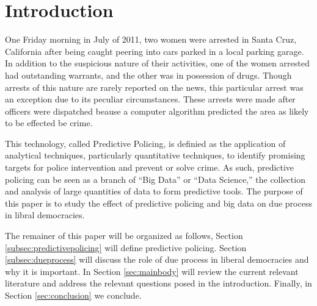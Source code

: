 \documentclass[12pt]{article} %
\newcommand{\hlfixme}[1]{\fxfatal{\hl{#1}}}
\begin{document}
\clearpage\thispagestyle{empty}\addtocounter{page}{-1}
\tableofcontents %
\newpage %


\section{Introduction}\label{sec:introduction} %

One Friday morning in July of 2011, two women were arrested in Santa Cruz, California after being caught peering into cars parked in a local parking garage. In addition to the suspicious nature of their activities, one of the women arrested had outstanding warrants, and the other was in possession of drugs. Though arrests of this nature are rarely reported on the news, this particular arrest was an exception due to its peculiar circumstances. These arrests were made after officers were dispatched beause a computer algorithm predicted the area as likely to be effected be crime. \cite{nyt} 


This technology, called Predictive Policing, is definied as the application of analytical techniques, particularly quantitative techniques, to identify promising targets for police intervention and prevent or solve crime. \cite{perryetal} As such, predictive policing can be seen as a branch of ``Big Data'' or ``Data Science,'' the collection and analysis of large quantities of data to form predictive tools. The purpose of this paper is to study the effect of predictive policing and big data on due process in libral democracies. %

The remainer of this paper will be organized as follows, Section \ref{subsec:predictivepolicing} will define predictive policing.
Section \ref{subsec:dueprocess} will discuss the role of due process in liberal democracies and why it is important. In Section \ref{sec:mainbody} will review the current relevant literature and address the relevant questions posed in the introduction. Finally, in Section \ref{sec:conclusion} we conclude.
\end{document}
